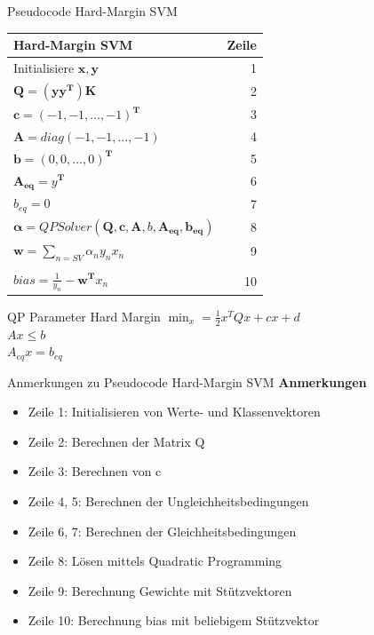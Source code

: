 \documentclass[ngerman]{beamer}
\begin{document}
\begin{frame}{Pseudocode Hard-Margin SVM}
    \centering
    \begin{tabular}{l r}
        \textbf{Hard-Margin SVM} & \textbf{Zeile} \\
        \hline
        Initialisiere $\mathbf{x}, \mathbf{y}$ & 1\\ \pause
        $\mathbf{Q} = (\mathbf{y}\mathbf{y}^{\mathbf{T}})\mathbf{K}$ & 2\\ \pause
        $\mathbf{c} = \left( -1, -1, \ldots, -1 \right)^{\mathbf{T}}$ & 3 \\ \pause
        $\mathbf{A} = diag\left( -1, -1, \ldots, -1 \right)$ & 4 \\
        $\mathbf{b} = \left( 0, 0, \ldots, 0 \right)^{\mathbf{T}}$ & 5\\ \pause
        $\mathbf{A_{eq}} = y^{\mathbf{T}}$ & 6\\
        $b_{eq} = 0$ & 7\\ \pause
        $\mathbf{\alpha} = QPSolver\left( \mathbf{Q}, \mathbf{c}, \mathbf{A}, b, \mathbf{A_{eq}}, \mathbf{b_{eq}} \right)$ & 8\\ \pause
        $\mathbf{w} = \sum\limits_{n=SV} \alpha_{n} y_{n} x_{n}$  & 9\\ \pause
        & \\[-1em]
        $bias = \frac{1}{y_{n}} - \mathbf{w}^{\mathbf{T}}x_{n}$ & 10\\
    \end{tabular}
\end{frame}

\begin{frame}{QP Parameter Hard Margin}
    \centering
    $\min_{x} = \frac{1}{2} x^{T} Q x + c x + d $ \\
    $A x \leq b$ \\
    $A_{e q} x = b_{e q}$ \\
\end{frame}

\begin{frame}{Anmerkungen zu Pseudocode Hard-Margin SVM}
    \textbf{Anmerkungen} \\
    \begin{itemize}
        \item Zeile 1: Initialisieren von Werte- und Klassenvektoren
        \item Zeile 2: Berechnen der Matrix Q
        \item Zeile 3: Berechnen von c
        \item Zeile 4, 5: Berechnen der Ungleichheitsbedingungen
        \item Zeile 6, 7: Berechnen der Gleichheitsbedingungen
        \item Zeile 8: Lösen mittels Quadratic Programming
        \item Zeile 9: Berechnung Gewichte mit Stützvektoren
        \item Zeile 10: Berechnung bias mit beliebigem Stützvektor
    \end{itemize}
\end{frame}
\end{document}
